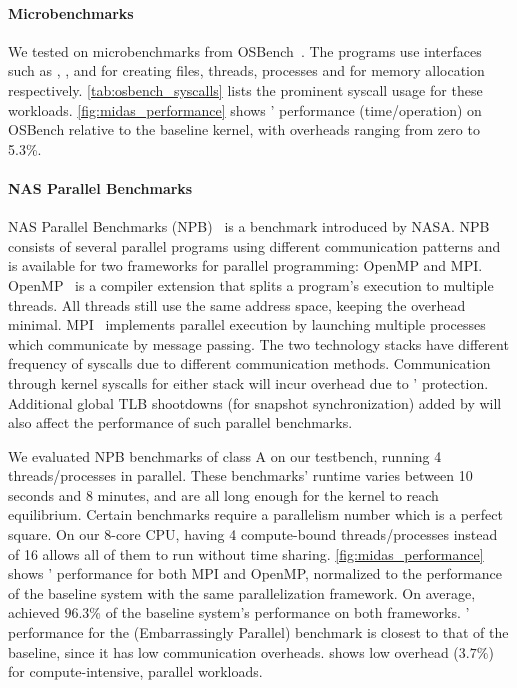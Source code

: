 \documentclass[letterpaper,twocolumn,10pt]{article}
\begin{document}
\paragraph{Microbenchmarks}
We tested \midas on microbenchmarks from 
OSBench~\cite{osbench}.
The programs use  interfaces such as , 
,  and  for creating files, 
threads, processes and for memory allocation respectively.  
\autoref{tab:osbench_syscalls} lists the prominent syscall usage 
for these workloads.
\autoref{fig:midas_performance} shows \midas' performance (time/operation) 
on OSBench relative to the baseline kernel, with overheads ranging from 
zero to 5.3\%.

\paragraph{NAS Parallel Benchmarks}
NAS Parallel Benchmarks (NPB)~\cite{npb} is a benchmark introduced by
NASA. 
NPB consists of several parallel programs using different communication
patterns and is available for two frameworks for parallel programming:
OpenMP and MPI.
OpenMP~\cite{dagum1998openmp} is a compiler extension that splits a 
program's execution to multiple threads. 
All threads still use the same address space, keeping the overhead minimal. 
MPI~\cite{snir1998mpi} implements parallel execution by launching multiple
processes which communicate by message passing. 
The two technology stacks have different frequency of syscalls due to 
different communication methods.
Communication through kernel syscalls for either stack will incur overhead
due to \midas' protection.
Additional global TLB shootdowns (for snapshot synchronization) added by 
\midas will also affect the performance of such parallel benchmarks.

We evaluated NPB benchmarks of class A on our testbench, running 
4 threads/processes in parallel.
These benchmarks' runtime varies between 10 seconds and 8 minutes, 
and are all long enough for the kernel to reach equilibrium.
Certain benchmarks require a parallelism number which is a perfect square.
On our 8-core CPU, having 4 compute-bound threads/processes instead of 16 allows 
all of them to run without time sharing.
\autoref{fig:midas_performance} shows \midas' performance for both MPI and OpenMP,
normalized to the performance of the baseline system with the same parallelization
framework.
On average, \midas achieved $96.3\%$ of the baseline system's performance on 
both frameworks. 
\midas' performance for the  (Embarrassingly Parallel) benchmark is 
closest to that of the baseline, since it has low communication overheads.
\midas shows low overhead ($3.7\%$) for compute-intensive, parallel workloads.
\end{document}
